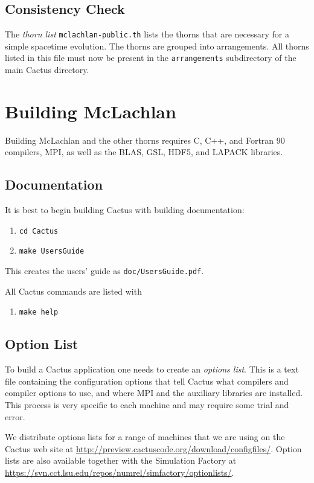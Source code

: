 \documentclass[11pt, tightenlines]{revtex4}
\newcommand{\code}[1]{\texttt{#1}}
\begin{document}
\subsection{Consistency Check}

The \emph{thorn list} \code{mclachlan-public.th} lists the thorns
that are necessary for a simple spacetime evolution.  The thorns are
grouped into arrangements.  All thorns listed in this file must now be
present in the \code{arrangements} subdirectory of the main Cactus
directory.



\section{Building McLachlan}

Building McLachlan and the other thorns requires C, C++, and Fortran
90 compilers, MPI, as well as the BLAS, GSL, HDF5, and LAPACK
libraries.

\subsection{Documentation}

It is best to begin building Cactus with building documentation:
\begin{enumerate}
\item\verb+cd Cactus+
\item\verb+make UsersGuide+
\end{enumerate}
This creates the users' guide as \code{doc/UsersGuide.pdf}.

All Cactus commands are listed with
\begin{enumerate}
\item\verb+make help+
\end{enumerate}

\subsection{Option List}

To build a Cactus application one needs to create an \emph{options
  list}.  This is a text file containing the configuration options
that tell Cactus what compilers and compiler options to use, and where
MPI and the auxiliary libraries are installed.  This process is very
specific to each machine and may require some trial and error.

We distribute options lists for a range of machines that we are using
on the Cactus web site at
\url{http://preview.cactuscode.org/download/configfiles/}.  Option
lists are also available together with the Simulation Factory
\cite{ES-simfactoryweb} at
\url{https://svn.cct.lsu.edu/repos/numrel/simfactory/optionlists/}.
\end{document}
